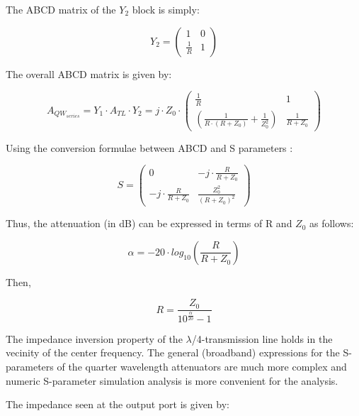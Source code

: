 \noindent The ABCD matrix of the $Y_2$ block is simply:

\begin{equation}
	Y_{2} = \begin{pmatrix}
				1 & 0\\
				\frac{1}{R}  & 1
		     \end{pmatrix}
\end{equation}

\noindent The overall ABCD matrix is given by:

\begin{equation}
	A_{QW_{series}} = Y_1 \cdot A_{TL} \cdot Y_2 = j \cdot Z_0 \cdot \begin{pmatrix}
				\frac{1}{R} & 1\\
				\left( \frac{1}{R \cdot (R + Z_0)} + \frac{1}{Z_0^2} \right)  & \frac{1}{R + Z_0}
		     \end{pmatrix}
\end{equation}

\noindent Using the conversion formulae between ABCD and S parameters \cite{pozar2012microwave}:

\begin{equation}
	S = \begin{pmatrix}
				0 & -j \cdot \frac{R}{R + Z_0}\\
				-j \cdot \frac{R}{R+Z_0}  & \frac{Z_0^2}{(R + Z_0)^2}
		\end{pmatrix}
\end{equation}

\noindent Thus, the attenuation (in dB) can be expressed in terms of R and $Z_0$ as follows:

\begin{equation}
	\alpha = -20 \cdot log_{10} \left( \frac{R}{R+Z_0}\right)
\end{equation}

\noindent Then,

\begin{equation}
	R = \frac{Z_0}{10^{\frac{\alpha}{20}} - 1}
\end{equation}

\noindent The impedance inversion property of the $\lambda$/4-transmission line holds in the vecinity of the center frequency. The general (broadband) expressions for the S-parameters of the quarter wavelength attenuators are much more complex and numeric S-parameter simulation analysis is more convenient for the analysis.

\noindent The impedance seen at the output port is given by:

